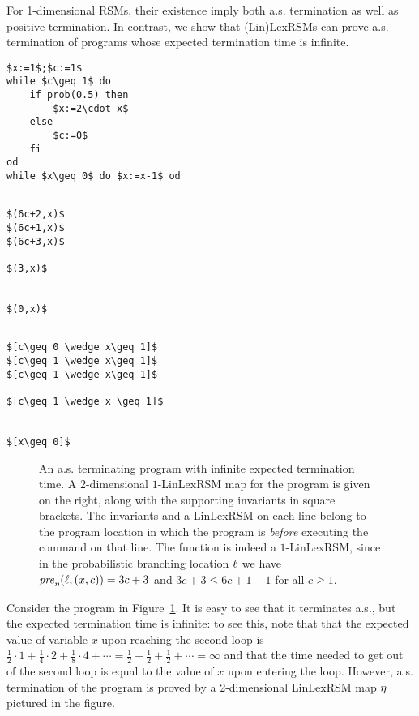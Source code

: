 For 1-dimensional RSMs, their existence imply both a.s. termination as 
well as positive termination.
In contrast, we show that (Lin)LexRSMs can prove a.s. termination of programs 
whose expected termination time is infinite.
\lstset{language=affprob}
\lstset{tabsize=2,escapechar=\&}
\newsavebox{\infas}
\begin{lrbox}{\infas}
	\begin{lstlisting}[mathescape]
$x:=1$;$c:=1$ 
while $c\geq 1$ do				
	if prob(0.5) then			
		$x:=2\cdot x$			
	else						
		$c:=0$					
	fi							
od								
while $x\geq 0$ do $x:=x-1$ od	
	\end{lstlisting}
\end{lrbox}
\newsavebox{\infast}
\begin{lrbox}{\infast}
	\begin{lstlisting}[mathescape]

$(6c+2,x)$
$(6c+1,x)$
$(6c+3,x)$

$(3,x)$


$(0,x)$	
	\end{lstlisting}
\end{lrbox}
\newsavebox{\infastinv}
\begin{lrbox}{\infastinv}
	\begin{lstlisting}[mathescape]

$[c\geq 0 \wedge x\geq 1]$
$[c\geq 1 \wedge x\geq 1]$
$[c\geq 1 \wedge x\geq 1]$

$[c\geq 1 \wedge x \geq 1]$


$[x\geq 0]$	
	\end{lstlisting}
\end{lrbox}
\begin{figure}[t]
	\centering
	\usebox{\infas}
	\hspace{0.1cm}
	\usebox{\infast}
	\hspace{0.1cm}
	\usebox{\infastinv}
\caption{An a.s. terminating program with infinite expected termination time. A 
2-dimensional $1$-LinLexRSM map for the program is given on the right, along 
with the 
supporting invariants in square brackets. The invariants and a LinLexRSM on 
each 
line belong to the program location in which the program is \emph{before} 
executing the command on that line. The function is indeed a $1$-LinLexRSM, 
since in the probabilistic branching location $\ell$ we have 
$\mathit{pre}_{\eta}(\ell,(x,c))=3c+3$ and $3c+3\leq 6c+1-1$ for all $c\geq 1$.} 
\label{fig:inftime}
\end{figure}

\begin{example}
\label{ex:infinite-time}
Consider the program in Figure~\ref{fig:inftime}. It is easy to see that it 
terminates a.s., but the expected termination time is infinite: to see this, 
note that that the expected value of variable $x$ upon reaching the second loop 
is $\frac{1}{2}\cdot 1 + \frac{1}{4}\cdot 2 + \frac{1}{8}\cdot 4 + \cdots = 
\frac{1}{2}+\frac{1}{2}+\frac{1}{2}+\cdots=\infty$ and that the time needed to 
get out of the second loop is equal to the value of $x$ upon entering the loop. 
However, a.s. termination of the program is proved by a 2-dimensional LinLexRSM 
map
$\eta$ pictured in the figure.
\end{example}

